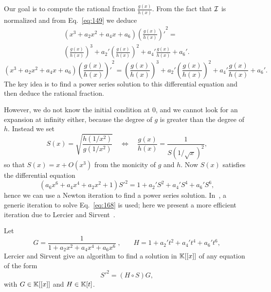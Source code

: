 Our goal is to compute the rational fraction $\frac{g(x)}{h(x)}$. From
the fact that $\mathcal{I}$ is normalized and from Eq.~\eqref{eq:149} we deduce
\ifafive
\begin{multline}
  \label{eq:166}
  (x^3 + a_2x^2 + a_4x + a_6){\left(\frac{g(x)}{h(x)}\right)'}^2 =\\
  \left(\frac{g(x)}{h(x)}\right)^3 + a_2'\left(\frac{g(x)}{h(x)}\right)^2 + a_4'\frac{g(x)}{h(x)} + a_6'
  \text{.}
\end{multline}
\else
\begin{equation}
  \label{eq:166}
  (x^3 + a_2x^2 + a_4x + a_6){\left(\frac{g(x)}{h(x)}\right)'}^2 =
  \left(\frac{g(x)}{h(x)}\right)^3 + a_2'\left(\frac{g(x)}{h(x)}\right)^2 + a_4'\frac{g(x)}{h(x)} + a_6'
  \text{.}
\end{equation}
\fi
The key idea is to find a power series solution to this differential
equation and then deduce the rational fraction.

  However, we do not
know the initial condition at $0$, and we cannot look for an expansion
at infinity either, because the degree of $g$ is greater than the
degree of $h$.  Instead we set
\begin{equation}
  \label{eq:167}
  S(x) = \sqrt{\frac{h(1/x^2)}{g(1/x^2)}}
  \quad\Leftrightarrow\quad
  \frac{g(x)}{h(x)} = \frac{1}{S(1/\sqrt{x})^2}
  \text{,}
\end{equation}
so that $S(x) = x + O(x^3)$ from the monicity of $g$ and $h$. Now
$S(x)$ satisfies the differential equation
\begin{equation}
  \label{eq:168}
  (a_6x^6 + a_4x^4 + a_2x^2 + 1){S'}^2 = 1 + a_2'S^2 + a_4'S^4 + a_6'S^6
  \text{,}
\end{equation}
hence we can use a Newton iteration to find a power series
solution. In~\cite[2.4]{bostan+morain+salvy+schost08}, a generic
iteration to solve Eq.~\eqref{eq:168} is used; here we present a more
efficient iteration due to Lercier and
Sirvent~\cite{lercier+sirvent08}.

Let 
\begin{equation}
  \label{eq:169}
  G = \frac{1}{1 + a_2x^2 + a_4x^4 + a_6x^6}
  \;\text{,}\qquad
  H = 1 + a_2't^2 + a_4't^4 + a_6't^6
  \text{,}
\end{equation}
Lercier and Sirvent give an algorithm to find a solution in $\mathbb{K}[[x]]$
of any equation of the form
\begin{equation}
  \label{eq:170}
  {S'}^2 = (H\circ S)G
  \text{,}
\end{equation}
with $G\in\mathbb{K}[[x]]$ and $H\in\mathbb{K}[t]$.


